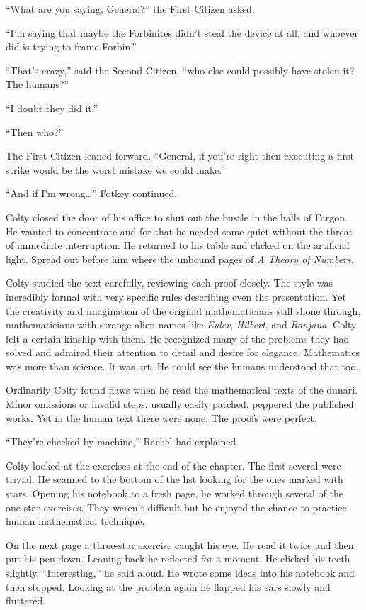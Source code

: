 ``What are you saying, General?'' the First Citizen asked.

``I'm saying that maybe the Forbinites didn't steal the device at all, and whoever did is trying
to frame Forbin.''

``That's crazy,'' said the Second Citizen, ``who else could possibly have stolen it? The
humans?''

``I doubt they did it.''

``Then who?''

The First Citizen leaned forward. ``General, if you're right then executing a first strike would
be the worst mistake we could make.''

``And if I'm wrong\ldots'' Fotkey continued.

\spacebreak

Colty closed the door of his office to shut out the bustle in the halls of Fargon. He wanted to
concentrate and for that he needed some quiet without the threat of immediate interruption. He
returned to his table and clicked on the artificial light. Spread out before him where the
unbound pages of \textit{A Theory of Numbers}.

Colty studied the text carefully, reviewing each proof closely. The style was incredibly formal
with very specific rules describing even the presentation. Yet the creativity and imagination of
the original mathematicians still shone through, mathematicians with strange alien names like
\textit{Euler}, \textit{Hilbert}, and \textit{Ranjana}. Colty felt a certain kinship with them.
He recognized many of the problems they had solved and admired their attention to detail and
desire for elegance. Mathematics was more than science. It was art. He could see the humans
understood that too.

Ordinarily Colty found flaws when he read the mathematical texts of the dunari. Minor omissions
or invalid steps, usually easily patched, peppered the published works. Yet in the human text
there were none. The proofs were perfect.

``They're checked by machine,'' Rachel had explained.

Colty looked at the exercises at the end of the chapter. The first several were trivial. He
scanned to the bottom of the list looking for the ones marked with stars. Opening his notebook
to a fresh page, he worked through several of the one-star exercises. They weren't difficult but
he enjoyed the chance to practice human mathematical technique.

On the next page a three-star exercise caught his eye. He read it twice and then put his pen
down. Leaning back he reflected for a moment. He clicked his teeth slightly. ``Interesting,'' he
said aloud. He wrote some ideas into his notebook and then stopped. Looking at the problem again
he flapped his ears slowly and fluttered.

